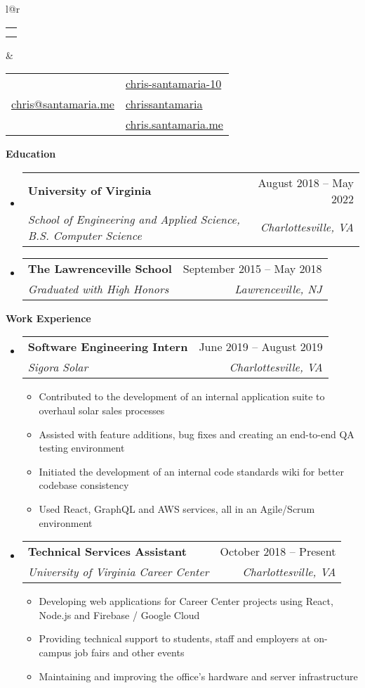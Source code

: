 \documentclass[letterpaper,12pt]{article}[leftmargin=*]
\makeatletter
\def \fullname {Chris Santamaria}
\def \subtitle {}
\def \linkedinicon {\faLinkedin}
\def \linkedinlink {https://www.linkedin.com/in/chris-santamaria-10//}
\def \linkedintext {chris-santamaria-10}
\def \phoneicon {\faPhone}
\def \phonetext {(813) 545-5164}
\def \emailicon {\faEnvelope}
\def \emaillink {mailto:chris@santamaria.me}
\def \emailtext {chris@santamaria.me}
\def \githubicon {\faGithub}
\def \githublink {https://github.com/chrissantamaria}
\def \githubtext {chrissantamaria}
\def \websiteicon {\faGlobe}
\def \websitelink {https://chris.santamaria.me/}
\def \websitetext {chris.santamaria.me}
\def \headertype {\doublecol} %
\def \entryspacing {-0pt}
\def \linkedin {\linkedinicon \hspace{3pt}\href{\linkedinlink}{\linkedintext}}
\def \phone {\phoneicon \hspace{3pt}{ \phonetext}}
\def \email {\emailicon \hspace{3pt}\href{\emaillink}{\emailtext}}
\def \github {\githubicon \hspace{3pt}\href{\githublink}{\githubtext}}
\def \website {\websiteicon \hspace{3pt}\href{\websitelink}{\websitetext}}
\renewcommand{\section}[2]{\vspace{5pt}
  \colorbox{secondary}{\color{white}\raggedbottom\normalsize\textbf{{#1}{\hspace{7pt}#2}}}
}
\newcommand{\resumeEntryStart}{\begin{itemize}[leftmargin=2.5mm]}
\newcommand{\resumeEntryEnd}{\end{itemize}\vspace{\entryspacing}}
\newcommand{\resumeItemListStart}{\begin{itemize}[leftmargin=4.5mm]}
\newcommand{\resumeItemListEnd}{\end{itemize}}
\newcommand{\resumeItem}[1]{
  \item\small{
    {#1 \vspace{-2pt}}
  }
}
\newcommand{\resumeEntryTSDL}[4]{
  \vspace{-1pt}\item[]
    \begin{tabular*}{0.97\textwidth}{l@{\extracolsep{\fill}}r}
      \textbf{\color{primary}#1} & {\firabook\color{accent}\small#2} \\
      \textit{\color{accent}\small#3} & \textit{\color{accent}\small#4} \\
    \end{tabular*}\vspace{-6pt}
}
\newcommand{\doublecol}[6]{
  \begin{tabular*}{\textwidth}{l@{\extracolsep{\fill}}r}
    {
      \begin{tabular}[c]{l}
        \fontsize{35}{45}\selectfont{\color{primary}{{\textbf{\fullname}}}} \\
        {\textit{\subtitle}} %
      \end{tabular}
    } & {
      \begin{tabular}[c]{l@{\hspace{1.5em}}l}
        {\small#4} & {\small#1} \\
        {\small#5} & {\small#2} \\
        {\small#6} & {\small#3}
      \end{tabular}
    }
  \end{tabular*}
}
\newcommand{\singlecol}[6]{
  \begin{tabular*}{\textwidth}{l@{\extracolsep{\fill}}r}
    {
      \begin{tabular}[b]{l}
        \fontsize{35}{45}\selectfont{\color{primary}{{\textbf{\fullname}}}} \\
        {\textit{\subtitle}} %
      \end{tabular}
    } & {
      \begin{tabular}[c]{l}
        {\small#1} \\
        {\small#2} \\
        {\small#3} \\
        {\small#4} \\
        {\small#5} \\
        {\small#6}
      \end{tabular}
    }
  \end{tabular*}
}
\makeatother
\begin{document}


\headertype{\linkedin}{\github}{\website}{\phone}{\email}{} %
\vspace{-10pt} %

\section{\faGraduationCap}{Education}

  \resumeEntryStart
    \resumeEntryTSDL
      {University of Virginia}{August 2018 -- May 2022}
      {School of Engineering and Applied Science, B.S. Computer Science}{Charlottesville, VA}
  \resumeEntryEnd
  \resumeEntryStart
  \resumeEntryTSDL
    {The Lawrenceville School}{September 2015 -- May 2018}
    {Graduated with High Honors}{Lawrenceville, NJ}
  \resumeEntryEnd

\section{\faCode}{Work Experience}

  \resumeEntryStart
    \resumeEntryTSDL
      {Software Engineering Intern}{June 2019 -- August 2019}
      {Sigora Solar}{Charlottesville, VA}
    \resumeItemListStart
      \resumeItem {Contributed to the development of an internal application suite to overhaul solar sales processes}
      \resumeItem {Assisted with feature additions, bug fixes and creating an end-to-end QA testing environment}
      \resumeItem {Initiated the development of an internal code standards wiki for better codebase consistency}
      \resumeItem {Used React, GraphQL and AWS services, all in an Agile/Scrum environment}
    \resumeItemListEnd
  \resumeEntryEnd

  \resumeEntryStart
    \resumeEntryTSDL
      {Technical Services Assistant}{October 2018 -- Present}
      {University of Virginia Career Center}{Charlottesville, VA}
    \resumeItemListStart
      \resumeItem {Developing web applications for Career Center projects using React, Node.js and Firebase / Google Cloud}
      \resumeItem {Providing technical support to students, staff and employers at on-campus job fairs and other events}
      \resumeItem {Maintaining and improving the office’s hardware and server infrastructure}
    \resumeItemListEnd
  \resumeEntryEnd
\end{document}
